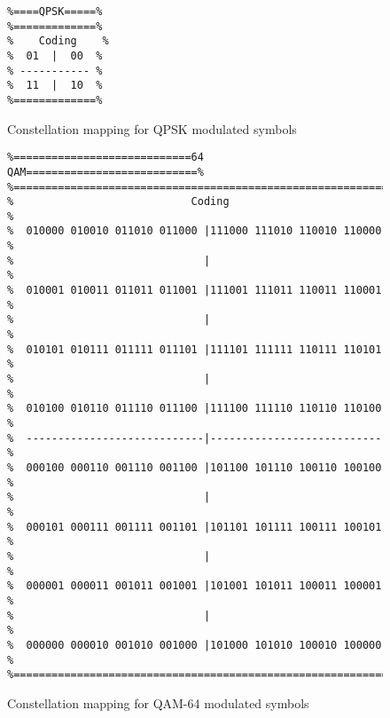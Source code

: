 \begin{figure} 
\centering
   \begin{verbatim}
%====QPSK=====%
%=============%
% 	 Coding    %
%  01  |  00  %
% ----------- %
%  11  |  10  %
%=============%
\end{verbatim}	
   \caption{Constellation mapping for QPSK modulated symbols}
   \label{fig:qpsk_mapping} 
\end{figure}
\begin{figure} 
\centering
   \begin{verbatim}
%============================64 QAM===========================%
%=============================================================%
%                            Coding                           % 
%  010000 010010 011010 011000 |111000 111010 110010 110000   % 
%                              |                              % 
%  010001 010011 011011 011001 |111001 111011 110011 110001   % 
%                              |                              % 
%  010101 010111 011111 011101 |111101 111111 110111 110101   % 
%                              |                              % 
%  010100 010110 011110 011100 |111100 111110 110110 110100   % 
%  ----------------------------|---------------------------   % 
%  000100 000110 001110 001100 |101100 101110 100110 100100   % 
%                              |                              % 
%  000101 000111 001111 001101 |101101 101111 100111 100101   % 
%                              |                              % 
%  000001 000011 001011 001001 |101001 101011 100011 100001   % 
%                              |                              % 
%  000000 000010 001010 001000 |101000 101010 100010 100000   % 
%=============================================================%
\end{verbatim}	
   \caption{Constellation mapping for QAM-64 modulated symbols}
   \label{fig:qam_mapping} 
\end{figure}